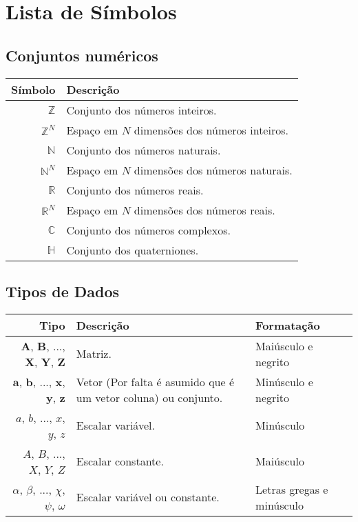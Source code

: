 \chapter*{Lista de Símbolos}

\singlespacing

\section*{Conjuntos numéricos}
\begin{tabular}{r | p{.55\linewidth}}
\hline	
Símbolo & Descrição \\ \hline
$\mathbb{Z}$& Conjunto dos números inteiros.  \\
$\mathbb{Z}^N$& Espaço em $N$ dimensões dos números inteiros.  \\
$\mathbb{N}$& Conjunto dos números naturais.  \\
$\mathbb{N}^N$& Espaço em $N$ dimensões dos números naturais.  \\
$\mathbb{R}$& Conjunto dos números reais.  \\
$\mathbb{R}^N$& Espaço em $N$ dimensões dos números reais.  \\
$\mathbb{C}$& Conjunto dos números complexos.  \\
$\mathbb{H}$& Conjunto dos quaterniones.  \\
\end{tabular}

\section*{Tipos de Dados}
\begin{tabular}{r | p{.45\linewidth} | l}
\hline	
Tipo & Descrição & Formatação \\ \hline
$\mathbf{A}$, $\mathbf{B}$, ..., $\mathbf{X}$, $\mathbf{Y}$, $\mathbf{Z}$& Matriz. & Maiúsculo e negrito \\
$\mathbf{a}$, $\mathbf{b}$, ..., $\mathbf{x}$, $\mathbf{y}$, $\mathbf{z}$ & Vetor (Por falta é asumido que é um vetor coluna) ou conjunto. & Minúsculo e negrito \\
$a$, $b$, ..., $x$, $y$, $z$ & Escalar variável. & Minúsculo \\
$A$, $B$, ..., $X$, $Y$, $Z$ & Escalar constante. & Maiúsculo \\
$\alpha$, $\beta$, ..., $\chi$, $\psi$, $\omega$ & Escalar variável ou constante. & Letras gregas e minúsculo  \\ \hline
\end{tabular}

